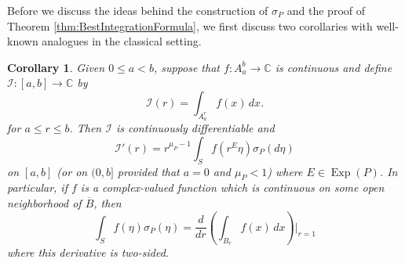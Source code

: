 \documentclass[11pt]{article}
\newtheorem{corollary}[theorem]{Corollary}
\theoremstyle{remark}
\newcommand\Exp{\operatorname{Exp}}
\begin{document}
\noindent 


\noindent Before we discuss the ideas behind the construction of $\sigma_P$ and the proof of Theorem \ref{thm:BestIntegrationFormula}, we first discuss two corollaries with well-known analogues in the classical setting. 

\begin{corollary}
Given $0\leq a<b$, suppose that $f:A_a^b\to\mathbb{C}$ is continuous and define $\mathcal{I}:[a,b]\to\mathbb{C}$ by
\begin{equation*}
\mathcal{I}(r)=\int_{A_a^r}f(x)\,dx.
\end{equation*}
for $a\leq r\leq b$. Then $\mathcal{I}$ is continuously differentiable and
\begin{equation*}
\mathcal{I}'(r)=r^{\mu_P-1}\int_S f(r^E\eta)\sigma_P(d\eta)
\end{equation*}
on $[a,b]$ (or on $(0,b]$ provided that $a=0$ and $\mu_P<1$) where $E\in\Exp(P)$. In particular, if $f$ is a complex-valued function which is continuous on some open neighborhood of $\overline{B}$, then
\begin{equation*}
\int_S f(\eta)\sigma_P(\eta)=\frac{d}{dr}\left(\int_{B_r}f(x)\,dx\right)\bigg\vert_{r=1}
\end{equation*}
where this derivative is two-sided.
\end{corollary}
\end{document}
